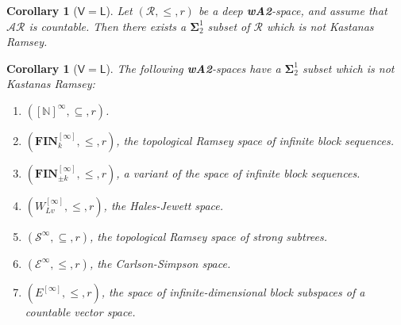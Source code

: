 \documentclass[11pt,reqno]{amsart}
\theoremstyle{plain}
\numberwithin{equation}{section}
\newtheorem{corollary}[theorem]{Corollary}
\theoremstyle{definition}
\newcommand{\N}{\mathbb{N}}
\newcommand{\cal}{\mathcal}
\renewcommand{\bf}{\mathbf}
\newcommand{\FIN}{\bf{FIN}}
\newcommand{\E}{\cal{E}}
\begin{document}
\begin{corollary}[$\mathsf{V=L}$]
\label{cor:V=L.gives.non.kr.set}
    Let $(\cal{R},\leq,r)$ be a deep \textbf{wA2}-space, and assume that $\cal{AR}$ is countable. Then there exists a $\mathbf{\Sigma}_2^1$ subset of $\cal{R}$ which is not Kastanas Ramsey.
\end{corollary}

\begin{corollary}[$\mathsf{V=L}$]
\label{cor:V=L.gives.non.kr.set.in.examples}
    The following \textbf{wA2}-spaces have a $\mathbf{\Sigma}_2^1$ subset which is not Kastanas Ramsey:
    \begin{enumerate}
        \item $([\N]^\infty,\subseteq,r)$.

        \item $(\FIN_k^{[\infty]},\leq,r)$, the topological Ramsey space of infinite block sequences.
        
        \item $(\FIN_{\pm k}^{[\infty]},\leq,r)$, a variant of the space of infinite block sequences.

        \item $(W_{Lv}^{[\infty]},\leq,r)$, the Hales-Jewett space.

        \item $(\mathcal{S}^\infty,\subseteq,r)$, the topological Ramsey space of strong subtrees.

        \item $(\E^\infty,\leq,r)$, the Carlson-Simpson space.

        \item $(E^{[\infty]},\leq,r)$, the space of infinite-dimensional block subspaces of a countable vector space.
    \end{enumerate}
\end{corollary}
\end{document}
